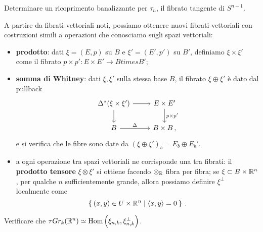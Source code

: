 \begin{exercise}
	Determinare un ricoprimento banalizzante per $\tau_{n}$, 
	il fibrato tangente di $S^{n-1}$.
\end{exercise}

A partire da fibrati vettoriali noti,
possiamo ottenere nuovi fibrati vettoriali con costruzioni
simili a operazioni che conosciamo sugli spazi vettoriali:
\begin{itemize}
	\item \textbf{prodotto}: dati
	$\xi = (E,p)$ su $B$ e $\xi'=(E',p')$ su $B'$,
	definiamo $\xi \times \xi'$ come il fibrato $p \times p' : E \times E' \to B times B'$;
	
	\item \textbf{somma di Whitney}: dati $\xi,\xi'$ sulla stessa base $B$,
	il fibrato $\xi \oplus \xi'$
	è dato dal pullback
	\begin{equation*}
		\begin{tikzcd}
			\Delta^{*}(\xi \times \xi') \ar[r] \ar[d]
			& E \times E' \ar[d, "p \times p'"] \\
			B \ar[r, "\Delta"] & B \times B\,,
		\end{tikzcd}
	\end{equation*}
	e si verifica che le fibre sono date da $\left( \xi \oplus \xi' \right)_{b} = E_{b} \oplus E_{b}'$.
	
	\item a ogni operazione tra spazi vettoriali ne corrisponde una tra fibrati:
	il \textbf{prodotto tensore} $\xi \otimes \xi'$ si ottiene facendo $\otimes_{{\mathbb R}}$ fibra per fibra;
	se $\xi \subset B \times {\mathbb R}^{n}$, per qualche $n$ sufficientemente grande, 
	allora possiamo definire $\xi^{\perp}$
	localmente come 
	\begin{equation*}
		\Set{(x,y) \in U \times {\mathbb R}^{n} | \langle x , y \rangle = 0}\,.
	\end{equation*}
\end{itemize}

\begin{exercise}
	Verificare che $\tau Gr_{k}({\mathbb R}^{n}) \simeq \operatorname{Hom}\left(\xi_{n,k},\xi_{n,k}^{\perp}\right)$.
\end{exercise}



